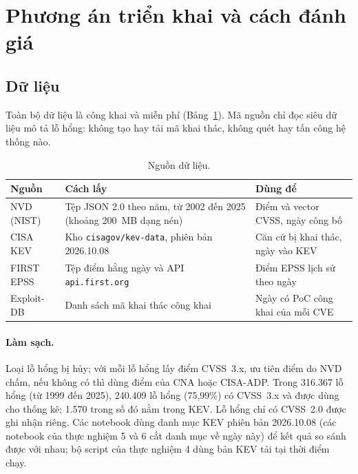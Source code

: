 \documentclass[runningheads]{llncs}
\begin{document}
\section{Phương án triển khai và cách đánh giá}\label{sec:trienkhai}

\subsection{Dữ liệu}

Toàn bộ dữ liệu là công khai và miễn phí (Bảng~\ref{tab:dulieu}). Mã nguồn chỉ đọc siêu dữ
liệu mô tả lỗ hổng: không tạo hay tải mã khai thác, không quét hay tấn công hệ thống nào.

\begin{table}
\centering
\caption{Nguồn dữ liệu.}\label{tab:dulieu}
\begin{tabular}{p{2.2cm}p{4.6cm}p{4.4cm}}
\toprule
Nguồn & Cách lấy & Dùng để \\
\midrule
NVD (NIST) & Tệp JSON 2.0 theo năm, từ 2002 đến 2025 (khoảng 200~MB dạng nén) & Điểm và vector CVSS, ngày công bố \\
CISA KEV & Kho \texttt{cisagov/kev-data}, phiên bản 2026.10.08 & Căn cứ bị khai thác, ngày vào KEV \\
FIRST EPSS & Tệp điểm hằng ngày và API \texttt{api.first.org} & Điểm EPSS lịch sử theo ngày \\
Exploit-DB & Danh sách mã khai thác công khai~\cite{exploitdb} & Ngày có PoC công khai của mỗi CVE \\
\bottomrule
\end{tabular}
\end{table}

\paragraph{Làm sạch.} Loại lỗ hổng bị hủy; với mỗi lỗ hổng lấy điểm CVSS~3.x, ưu tiên điểm
do NVD chấm, nếu không có thì dùng điểm của CNA hoặc CISA-ADP. Trong 316.367 lỗ hổng (từ 1999 đến 2025),
240.409 lỗ hổng (75,99\%) có CVSS~3.x và được dùng cho thống kê; 1.570 trong số đó nằm trong
KEV. Lỗ hổng chỉ có CVSS~2.0 được ghi nhận riêng. Các notebook dùng danh mục KEV phiên bản
2026.10.08 (các notebook của thực nghiệm 5 và 6 cắt danh mục về ngày này) để kết quả so sánh được
với nhau; bộ script của thực nghiệm 4 dùng bản KEV tải tại thời điểm chạy.
\end{document}
